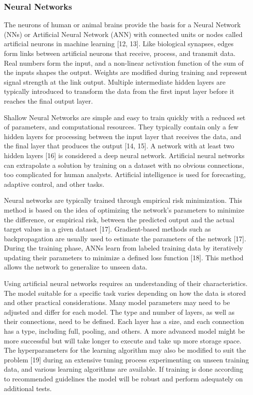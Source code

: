 \documentclass[preprint,12pt]{elsarticle}
\begin{document}
\subsubsection{Neural Networks}

The neurons of human or animal brains provide the basis for a Neural Network (NNs) or Artificial Neural Network (ANN) with connected units or nodes called artificial neurons in machine learning [12, 13]. Like biological synapses, edges form links between artificial neurons that receive, process, and transmit data. Real numbers form the input, and a non-linear activation function of the sum of the inputs shapes the output. Weights are modified during training and represent signal strength at the link output. Multiple intermediate hidden layers are typically introduced to transform the data from the first input layer before it reaches the final output layer. 

Shallow Neural Networks are simple and easy to train quickly with a reduced set of parameters, and computational resources. They typically contain only a few hidden layers for processing between the input layer that receives the data, and the final layer that produces the output [14, 15].  A network with at least two hidden layers [16] is considered a deep neural network. Artificial neural networks can extrapolate a solution by training on a dataset with no obvious connections, too complicated for human analysts. Artificial intelligence is used for forecasting, adaptive control, and other tasks.

Neural networks are typically trained through empirical risk minimization. This method is based on the idea of optimizing the network's parameters to minimize the difference, or empirical risk, between the predicted output and the actual target values in a given dataset [17]. Gradient-based methods such as backpropagation are usually used to estimate the parameters of the network [17]. During the training phase, ANNs learn from labeled training data by iteratively updating their parameters to minimize a defined loss function [18]. This method allows the network to generalize to unseen data.

Using artificial neural networks requires an understanding of their characteristics. The model suitable for a specific task varies depending on how the data is stored and other practical considerations. Many model parameters may need to be adjusted and differ for each model. The type and number of layers, as well as their connections, need to be defined. Each layer has a size, and each connection has a type, including full, pooling, and others. A more advanced model might be more successful but will take longer to execute and take up more storage space. The hyperparameters for the learning algorithm may also be modified to suit the problem [19] during an extensive tuning process experimenting on unseen training data, and various learning algorithms are available. If training is done according to recommended guidelines the model will be robust and perform adequately on additional tests.
\end{document}
